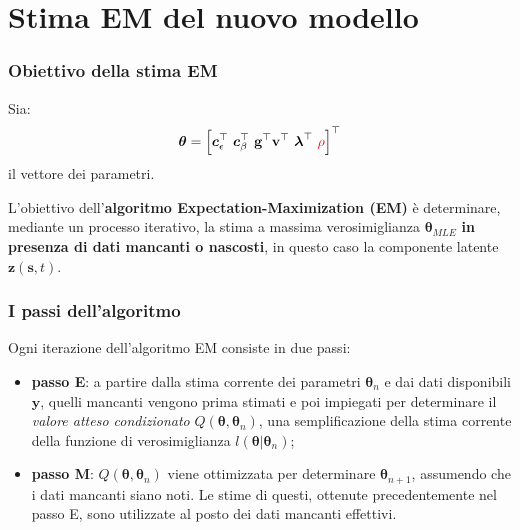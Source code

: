 \section{Stima EM del nuovo modello}

\begin{frame}
	\frametitle{Obiettivo della stima EM}
	\justifying
	
	Sia:
	\begin{equation*}
		\boldsymbol{\theta} = \left[\boldsymbol{c}_\epsilon^\top \ \boldsymbol{c}_\beta^\top \ \mathbf{g}^\top \mathbf{v}^\top \ \boldsymbol{\lambda}^\top \ \textcolor{red}{\rho}\right]^\top
	\end{equation*}
	il vettore dei parametri. 
	\newline \par L'obiettivo dell'\textbf{algoritmo Expectation-Maximization (EM)} è determinare, mediante un processo iterativo, la stima a massima verosimiglianza $\boldsymbol{\theta}_{MLE}$ \textbf{in presenza di dati mancanti o nascosti}, in questo caso la componente latente $\mathbf{z}(\mathbf{s}, t)$.
\end{frame}

\begin{frame}
	\frametitle{I passi dell'algoritmo}
	\justifying
	
	Ogni iterazione dell'algoritmo EM consiste in due passi:
	\begin{itemize}
		\justifying
		\item \textbf{passo E}: a partire dalla stima corrente dei parametri $\boldsymbol{\theta}_n$ e dai dati disponibili $\mathbf{y}$, quelli mancanti vengono prima stimati e poi impiegati per determinare il \textit{valore atteso condizionato} $Q(\boldsymbol{\theta},\boldsymbol{\theta}_n)$, una semplificazione della stima corrente della funzione di verosimiglianza $l(\boldsymbol{\theta}|\boldsymbol{\theta}_n)$;
		\item \textbf{passo M}: $Q(\boldsymbol{\theta},\boldsymbol{\theta}_n)$ viene ottimizzata per determinare $\boldsymbol{\theta}_{n+1}$, assumendo che i dati mancanti siano noti. Le stime di questi, ottenute precedentemente nel passo E, sono utilizzate al posto dei dati mancanti effettivi.
	\end{itemize}
\end{frame}

